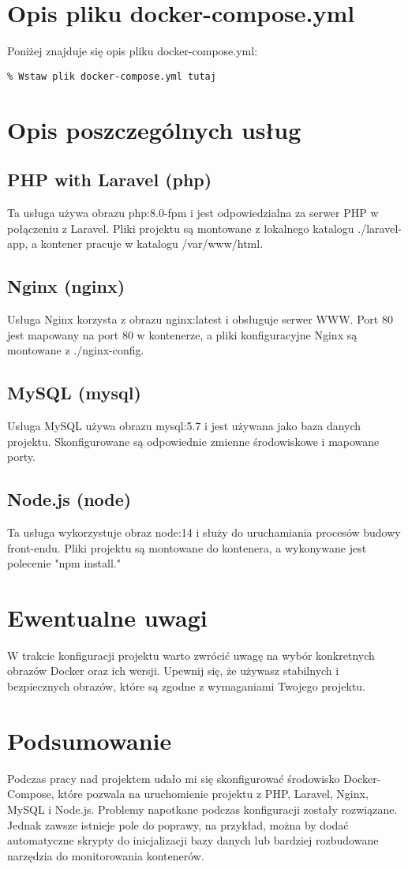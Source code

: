 \documentclass{article}
\begin{document}
\section{Opis pliku docker-compose.yml}
Poniżej znajduje się opis pliku docker-compose.yml:

\begin{verbatim}
% Wstaw plik docker-compose.yml tutaj
\end{verbatim}

\section{Opis poszczególnych usług}
\subsection{PHP with Laravel (php)}
Ta usługa używa obrazu php:8.0-fpm i jest odpowiedzialna za serwer PHP w połączeniu z Laravel. Pliki projektu są montowane z lokalnego katalogu ./laravel-app, a kontener pracuje w katalogu /var/www/html.

\subsection{Nginx (nginx)}
Usługa Nginx korzysta z obrazu nginx:latest i obsługuje serwer WWW. Port 80 jest mapowany na port 80 w kontenerze, a pliki konfiguracyjne Nginx są montowane z ./nginx-config.

\subsection{MySQL (mysql)}
Usługa MySQL używa obrazu mysql:5.7 i jest używana jako baza danych projektu. Skonfigurowane są odpowiednie zmienne środowiskowe i mapowane porty.

\subsection{Node.js (node)}
Ta usługa wykorzystuje obraz node:14 i służy do uruchamiania procesów budowy front-endu. Pliki projektu są montowane do kontenera, a wykonywane jest polecenie "npm install."

\section{Ewentualne uwagi}
W trakcie konfiguracji projektu warto zwrócić uwagę na wybór konkretnych obrazów Docker oraz ich wersji. Upewnij się, że używasz stabilnych i bezpiecznych obrazów, które są zgodne z wymaganiami Twojego projektu.

\section{Podsumowanie}
Podczas pracy nad projektem udało mi się skonfigurować środowisko Docker-Compose, które pozwala na uruchomienie projektu z PHP, Laravel, Nginx, MySQL i Node.js. Problemy napotkane podczas konfiguracji zostały rozwiązane. Jednak zawsze istnieje pole do poprawy, na przykład, można by dodać automatyczne skrypty do inicjalizacji bazy danych lub bardziej rozbudowane narzędzia do monitorowania kontenerów.
\end{document}

